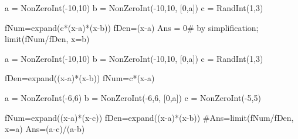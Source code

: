 \begin{sagesilent}
a = NonZeroInt(-10,10)
b = NonZeroInt(-10,10, [0,a])
c = RandInt(1,3)

fNum=expand(c*(x-a)*(x-b))
fDen=(x-a)
Ans = 0# by simplification; limit(fNum/fDen, x=b)
\end{sagesilent}



\begin{sagesilent}
a = NonZeroInt(-10,10)
b = NonZeroInt(-10,10, [0,a])
c = RandInt(1,3)

fDen=expand((x-a)*(x-b))
fNum=c*(x-a)
\end{sagesilent}



\begin{sagesilent}
a = NonZeroInt(-6,6)
b = NonZeroInt(-6,6, [0,a])
c = NonZeroInt(-5,5)

fNum=expand((x-a)*(x-c))
fDen=expand((x-a)*(x-b))
#Ans=limit(fNum/fDen, x=a)
Ans=(a-c)/(a-b)
\end{sagesilent}

